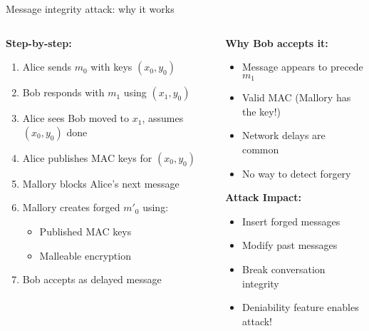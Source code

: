 \documentclass[aspectratio=169, lualatex, handout]{beamer}
\begin{document}
\begin{frame}{Message integrity attack: why it works}
	\begin{columns}
		\begin{column}{0.5\textwidth}
			\textbf{Step-by-step:}
			\begin{enumerate}
				\item Alice sends $m_0$ with keys $(x_0, y_0)$
				\item Bob responds with $m_1$ using $(x_1, y_0)$
				\item Alice sees Bob moved to $x_1$, assumes $(x_0, y_0)$ done
				\item Alice publishes MAC keys for $(x_0, y_0)$
				\item Mallory blocks Alice's next message
				\item Mallory creates forged $m'_0$ using:
				      \begin{itemize}
					      \item Published MAC keys
					      \item Malleable encryption
				      \end{itemize}
				\item Bob accepts as delayed message
			\end{enumerate}
		\end{column}
		\begin{column}{0.5\textwidth}
			\textbf{Why Bob accepts it:}
			\begin{itemize}
				\item Message appears to precede $m_1$
				\item Valid MAC (Mallory has the key!)
				\item Network delays are common
				\item No way to detect forgery
			\end{itemize}
			\textbf{Attack Impact:}
			\begin{itemize}
				\item Insert forged messages
				\item Modify past messages
				\item Break conversation integrity
				\item Deniability feature enables attack!
			\end{itemize}
		\end{column}
	\end{columns}
\end{frame}
\end{document}
